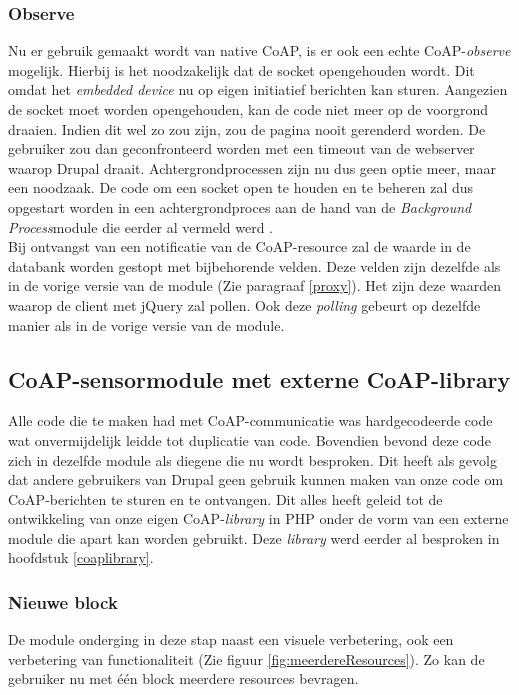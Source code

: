 \subsubsection{Observe}
Nu er gebruik gemaakt wordt van native CoAP, is er ook een echte CoAP-\textit{observe} mogelijk. Hierbij is het noodzakelijk dat de socket opengehouden wordt. Dit omdat het \textit{embedded device} nu op eigen initiatief berichten kan sturen. Aangezien de socket moet worden opengehouden, kan de code niet meer op de voorgrond draaien. Indien dit wel zo zou zijn, zou de pagina nooit gerenderd worden. De gebruiker zou dan geconfronteerd worden met een timeout van de webserver waarop Drupal draait. Achtergrondprocessen zijn nu dus geen optie meer, maar een noodzaak. De code om een socket open te houden en te beheren zal dus opgestart worden in een achtergrondproces aan de hand van de \textit{Background Process}module die eerder al vermeld werd \cite{backgroundProcessModule}.\\
Bij ontvangst van een notificatie van de CoAP-resource zal de waarde in de databank worden gestopt met bijbehorende velden. Deze velden zijn dezelfde als in de vorige versie van de module (Zie paragraaf \ref{proxy}). Het zijn deze waarden waarop de client met jQuery zal pollen. Ook deze \textit{polling} gebeurt op dezelfde manier als in de vorige versie van de module.

\subsection{CoAP-sensormodule met externe CoAP-library}
Alle code die te maken had met CoAP-communicatie was hardgecodeerde code wat onvermijdelijk leidde tot duplicatie van code. Bovendien bevond deze code zich in dezelfde module als diegene die nu wordt besproken. Dit heeft als gevolg dat andere gebruikers van Drupal geen gebruik kunnen maken van onze code om CoAP-berichten te sturen en te ontvangen. Dit alles heeft geleid tot de ontwikkeling van onze eigen CoAP-\textit{library} in PHP onder de vorm van een externe module die apart kan worden gebruikt. Deze \textit{library} werd eerder al besproken in hoofdstuk \ref{coaplibrary}.\\

\subsubsection{Nieuwe block}
De module onderging in deze stap naast een visuele verbetering, ook een verbetering van functionaliteit (Zie figuur \ref{fig:meerdereResources}). Zo kan de gebruiker nu met \'{e}\'{e}n block meerdere resources bevragen.\\

